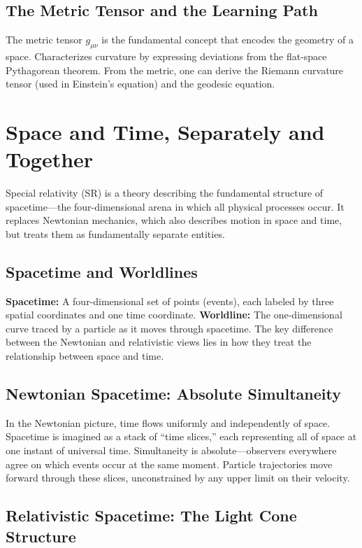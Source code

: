 \documentclass[11pt, a4paper]{report}
\begin{document}
\subsection*{The Metric Tensor and the Learning Path}

The metric tensor $g_{\mu\nu}$ is the fundamental concept that encodes the geometry of a space. 
Characterizes curvature by expressing deviations from the flat-space Pythagorean theorem. From the metric, one can derive the Riemann curvature tensor (used in Einstein's equation) and the geodesic equation.

\section{Space and Time, Separately and Together}

Special relativity (SR) is a theory describing the fundamental structure of spacetime—the four-dimensional arena in which all physical processes occur. 
It replaces Newtonian mechanics, which also describes motion in space and time, but treats them as fundamentally separate entities.

\subsection*{Spacetime and Worldlines}

\textbf{Spacetime:} A four-dimensional set of points (events), each labeled by three spatial coordinates and one time coordinate.
\newline
\textbf{Worldline:} The one-dimensional curve traced by a particle as it moves through spacetime.
The key difference between the Newtonian and relativistic views lies in how they treat the relationship between space and time.
\subsection*{Newtonian Spacetime: Absolute Simultaneity}

In the Newtonian picture, time flows uniformly and independently of space.  
Spacetime is imagined as a stack of ``time slices,'' each representing all of space at one instant of universal time.  
Simultaneity is absolute—observers everywhere agree on which events occur at the same moment.
Particle trajectories move forward through these slices, unconstrained by any upper limit on their velocity.

\subsection*{Relativistic Spacetime: The Light Cone Structure}
\end{document}
